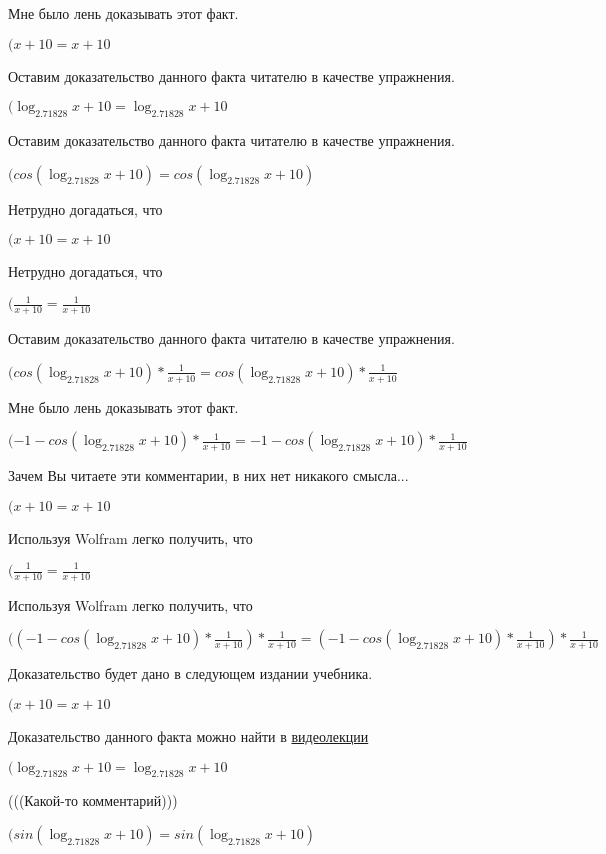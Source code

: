 \documentclass[12pt,a4paper,fleqn]{article}
\theoremstyle{definition}
\begin{document}
Мне было лень доказывать этот факт.

$( x  +  10  =  x  +  10 $

Оставим доказательство данного факта читателю в качестве упражнения.

$(\log_{ 2.71828 }{ x  +  10 } = \log_{ 2.71828 }{ x  +  10 }$

Оставим доказательство данного факта читателю в качестве упражнения.

$(cos(\log_{ 2.71828 }{ x  +  10 }) = cos(\log_{ 2.71828 }{ x  +  10 })$

Нетрудно догадаться, что

$( x  +  10  =  x  +  10 $

Нетрудно догадаться, что

$(\frac{ 1 }{ x  +  10 }
 = \frac{ 1 }{ x  +  10 }
$

Оставим доказательство данного факта читателю в качестве упражнения.

$(cos(\log_{ 2.71828 }{ x  +  10 }) * \frac{ 1 }{ x  +  10 }
 = cos(\log_{ 2.71828 }{ x  +  10 }) * \frac{ 1 }{ x  +  10 }
$

Мне было лень доказывать этот факт.

$( -1  - cos(\log_{ 2.71828 }{ x  +  10 }) * \frac{ 1 }{ x  +  10 }
 =  -1  - cos(\log_{ 2.71828 }{ x  +  10 }) * \frac{ 1 }{ x  +  10 }
$

Зачем Вы читаете эти комментарии, в них нет никакого смысла...

$( x  +  10  =  x  +  10 $

Используя Wolfram легко получить, что

$(\frac{ 1 }{ x  +  10 }
 = \frac{ 1 }{ x  +  10 }
$

Используя Wolfram легко получить, что

$(( -1  - cos(\log_{ 2.71828 }{ x  +  10 }) * \frac{ 1 }{ x  +  10 }
) * \frac{ 1 }{ x  +  10 }
 = ( -1  - cos(\log_{ 2.71828 }{ x  +  10 }) * \frac{ 1 }{ x  +  10 }
) * \frac{ 1 }{ x  +  10 }
$

Доказательство будет дано в следующем издании учебника.

$( x  +  10  =  x  +  10 $

Доказательство данного факта можно найти в \href{https://www.youtube.com/watch?v=dQw4w9WgXcQ}{видеолекции}

$(\log_{ 2.71828 }{ x  +  10 } = \log_{ 2.71828 }{ x  +  10 }$

(((Какой-то комментарий)))

$(sin(\log_{ 2.71828 }{ x  +  10 }) = sin(\log_{ 2.71828 }{ x  +  10 })$
\end{document}
